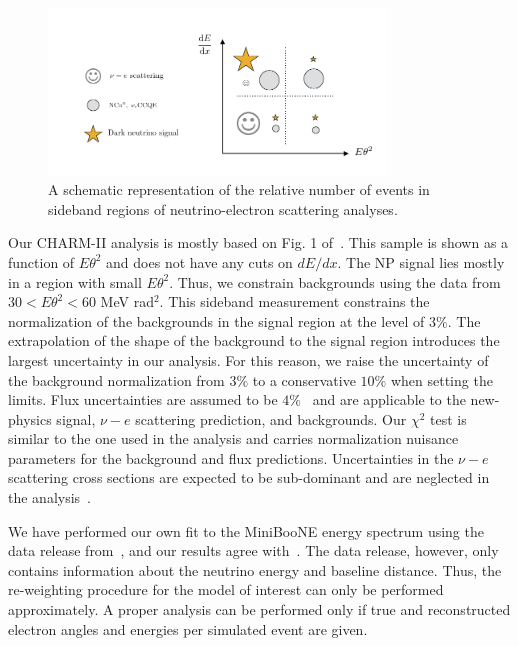 \begin{figure}
 \includegraphics[width = 0.8\textwidth]{MiniBooNE_tests.pdf}
 \caption[Diagram of the sidebands in neutrino-electron scattering analyses.]{A schematic representation of the relative number of events in sideband regions of neutrino-electron scattering analyses.}
\end{figure}


Our CHARM-II analysis is mostly based on Fig. 1 of~\cite{Vilain:1994qy}. This sample is shown as a function of $E\theta^2$ and does not have any cuts on $dE/dx$. The NP signal lies mostly in a region with small $E\theta^2$. Thus, we constrain backgrounds using the data from $30 < E\theta^2 < 60$ MeV rad$^2$. This sideband measurement constrains the normalization of the backgrounds in the signal region at the level of $3\%$.
The extrapolation of the shape of the background to the signal region introduces the largest uncertainty in our analysis. For this reason, we raise the uncertainty of the background normalization from $3\%$ to a conservative $10 \%$ when setting the limits. Flux uncertainties are assumed to be $4\%$~\cite{Allaby:1987bb} and are applicable to the new-physics signal, $\nu-e$ scattering prediction, and backgrounds. 
Our $\chi^2$ test is similar to the one used in the \minerva analysis and carries normalization nuisance parameters for the background and flux predictions. Uncertainties in the $\nu-e$ scattering cross sections are expected to be sub-dominant and are neglected in the analysis~\cite{deGouvea:2006hfo}.

We have performed our own fit to the MiniBooNE energy spectrum using the data release from~\cite{Aguilar-Arevalo:2018gpe}, and our results agree with~\cite{Bertuzzo:2018itn}. The data release, however, only contains information about the neutrino energy and baseline distance. Thus, the re-weighting procedure for the model of interest can only be performed approximately. A proper analysis can be performed only if true and reconstructed electron angles and energies per simulated event are given.  

